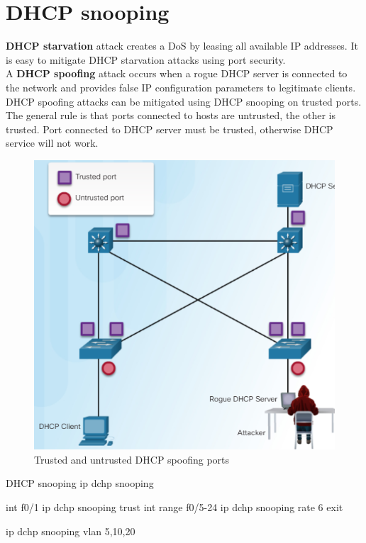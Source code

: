 \section{DHCP snooping}

\textbf{DHCP starvation} attack creates a DoS by leasing all available IP addresses. It is easy to mitigate DHCP starvation attacks using port security. \\

A \textbf{DHCP spoofing} attack occurs when a rogue DHCP server is connected to the network and provides false IP configuration parameters to legitimate clients. DHCP spoofing attacks can be mitigated using DHCP snooping on trusted ports. The general rule is that ports connected to hosts are untrusted, the other is trusted. Port connected to DHCP server must be trusted, otherwise DHCP service will not work.

\begin{figure}[hbtp]
\caption{Trusted and untrusted DHCP spoofing ports}\label{DHCPspoofing}
\centering
\includegraphics[scale=0.5]{pictures/DHCPspoofing.PNG}
\end{figure}

\begin{sexylisting}{DHCP snooping}
ip dchp snooping
 
int f0/1
ip dchp snooping trust
int range f0/5-24
ip dchp snooping rate 6
exit

ip dchp snooping vlan 5,10,20
\end{sexylisting}


